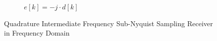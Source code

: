 \begin{figure}[h!]
\begin{subfigure}{0.45\textwidth}
    \caption{$e[k] = -j \cdot d[k]$}
    \label{fig:rx_2_freq_e}
  \end{subfigure}
  \caption{Quadrature Intermediate Frequency Sub-Nyquist Sampling Receiver
    in Frequency Domain}
  \label{fig:rx_2_freq}
\end{figure}

